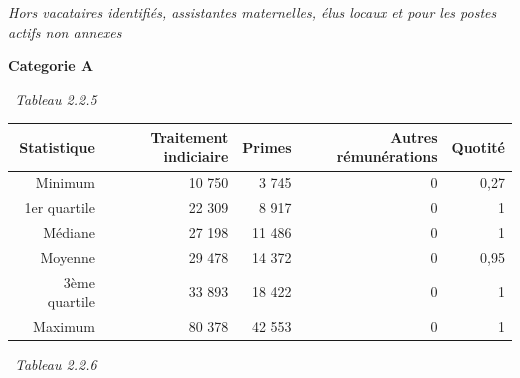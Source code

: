 \emph{Hors vacataires identifiés, assistantes maternelles, élus locaux
et pour les postes actifs non annexes}

\textbf{Categorie A}

~\emph{Tableau 2.2.5}

\begin{longtable}[]{@{}rrrrr@{}}
\toprule
Statistique & Traitement indiciaire & Primes & Autres rémunérations &
Quotité\tabularnewline
\midrule
\endhead
Minimum & 10 750 & 3 745 & 0 & 0,27\tabularnewline
1er quartile & 22 309 & 8 917 & 0 & 1\tabularnewline
Médiane & 27 198 & 11 486 & 0 & 1\tabularnewline
Moyenne & 29 478 & 14 372 & 0 & 0,95\tabularnewline
3ème quartile & 33 893 & 18 422 & 0 & 1\tabularnewline
Maximum & 80 378 & 42 553 & 0 & 1\tabularnewline
\bottomrule
\end{longtable}

~\emph{Tableau 2.2.6}

